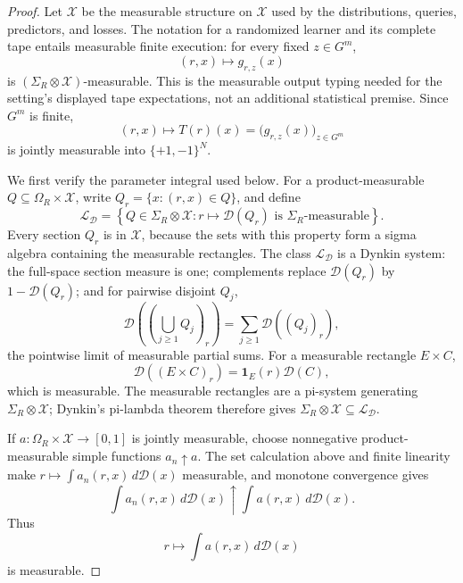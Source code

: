 \begin{proof}
Let \(\mathscr X\) be the measurable structure on \(\mathcal X\) used by
the distributions, queries, predictors, and losses.  The notation for a
randomized learner and its complete tape entails measurable finite
execution: for every fixed \(z\in G^m\),
\[
(r,x)\longmapsto g_{r,z}(x)
\tag{A.13}\label{eq:joint-replay-measurability}
\]
is \((\Sigma_R\otimes\mathscr X)\)-measurable.  This is the measurable
output typing needed for the setting's displayed tape expectations, not an
additional statistical premise.  Since \(G^m\) is finite,
\[
(r,x)\longmapsto T(r)(x)
=\bigl(g_{r,z}(x)\bigr)_{z\in G^m}
\tag{A.14}\label{eq:joint-map-measurability}
\]
is jointly measurable into \(\{+1,-1\}^N\).

We first verify the parameter integral used below.  For a
product-measurable \(Q\subseteq\Omega_R\times\mathcal X\), write
\(Q_r=\{x:(r,x)\in Q\}\), and define
\[
\mathcal L_{\mathcal D}
=\left\{Q\in\Sigma_R\otimes\mathscr X:
r\mapsto\mathcal D(Q_r)\text{ is }\Sigma_R\text{-measurable}\right\}.
\]
Every section \(Q_r\) is in \(\mathscr X\), because the sets with this
property form a sigma algebra containing the measurable rectangles.  The
class \(\mathcal L_{\mathcal D}\) is a Dynkin system: the full-space
section measure is one; complements replace \(\mathcal D(Q_r)\) by
\(1-\mathcal D(Q_r)\); and for pairwise disjoint \(Q_j\),
\[
\mathcal D\!\left(\left(\bigcup_{j\ge1}Q_j\right)_r\right)
=\sum_{j\ge1}\mathcal D((Q_j)_r),
\tag{A.15}\label{eq:section-disjoint-union}
\]
the pointwise limit of measurable partial sums.  For a measurable rectangle
\(E\times C\),
\[
\mathcal D((E\times C)_r)=\mathbf 1_E(r)\mathcal D(C),
\]
which is measurable.  The measurable rectangles are a pi-system generating
\(\Sigma_R\otimes\mathscr X\); Dynkin's pi-lambda theorem
\citep[Section~1]{Kallenberg2021} therefore gives
\(\Sigma_R\otimes\mathscr X\subseteq\mathcal L_{\mathcal D}\).

If \(a:\Omega_R\times\mathcal X\to[0,1]\) is jointly measurable, choose
nonnegative product-measurable simple functions \(a_n\uparrow a\).  The set
calculation above and finite linearity make
\(r\mapsto\int a_n(r,x)\,d\mathcal D(x)\) measurable, and monotone
convergence gives
\[
\int a_n(r,x)\,d\mathcal D(x)
\uparrow
\int a(r,x)\,d\mathcal D(x).
\tag{A.16}\label{eq:parameter-integral-limit}
\]
Thus
\[
r\longmapsto\int a(r,x)\,d\mathcal D(x)
\tag{A.17}\label{eq:parameter-integral}
\]
is measurable.


\end{proof}
